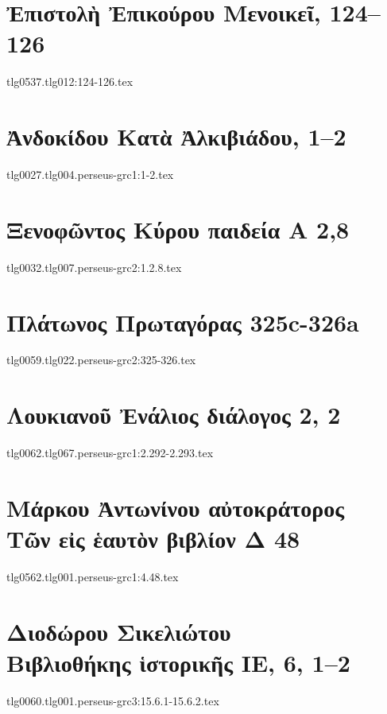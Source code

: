 \documentclass[a4paper,12pt,twoside]{report}
\begin{document}
\newpage





\chapter[Ἐπίκουρος Μενοικεῖ]{\textgreek[variant=ancient]{Ἐπιστολὴ Ἐπικούρου Μενοικεῖ,} 124–126}
{tlg0537.tlg012:124-126.tex}

\chapter[Ἀνδοκίδου Κατὰ Ἀλκιβιάδου]{\textgreek[variant=ancient]{Ἀνδοκίδου Κατὰ Ἀλκιβιάδου,} 1–2}
{tlg0027.tlg004.perseus-grc1:1-2.tex}

\chapter[Ξενοφῶντος Κύρου παιδεία]{\textgreek[variant=ancient]{Ξενοφῶντος Κύρου παιδεία Α} 2,8}
{tlg0032.tlg007.perseus-grc2:1.2.8.tex}

\chapter[Πλάτωνος Πρωταγόρας]{\textgreek[variant=ancient]{Πλάτωνος Πρωταγόρας} 325c-326a}
{tlg0059.tlg022.perseus-grc2:325-326.tex}

\chapter[Λουκιανοῦ Ἐνάλιος διάλογος]{\textgreek[variant=ancient]{Λουκιανοῦ Ἐνάλιος διάλογος} 2, 2}
{tlg0062.tlg067.perseus-grc1:2.292-2.293.tex}

\chapter[Μάρκου Ἀντωνίνου Τῶν εἰς ἑαυτὸν Δ]{\textgreek[variant=ancient]{Μάρκου Ἀντωνίνου αὐτοκράτορος \\Τῶν εἰς ἑαυτὸν βιβλίον Δ} 48}
{tlg0562.tlg001.perseus-grc1:4.48.tex}

\chapter[Διοδώρου Βιβλιοθήκης ἱστορικής ΙΕ]{\textgreek[variant=ancient]{Διοδώρου Σικελιώτου \\Βιβλιοθήκης ἱστορικῆς ΙΕ,} 6, 1–2}
{tlg0060.tlg001.perseus-grc3:15.6.1-15.6.2.tex}
\end{document}
